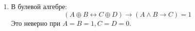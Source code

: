 \documentclass[12pt]{article}
\begin{document}
\begin{enumerate}
        \item В булевой алгебре:
        \begin{equation*}
            (A \oplus B \leftrightarrow C \oplus D) \rightarrow
            (A \wedge B \rightarrow C) = 1
        \end{equation*}
        Это неверно при $A = B = 1, C = D = 0$.
    \end{enumerate}
\end{document}
